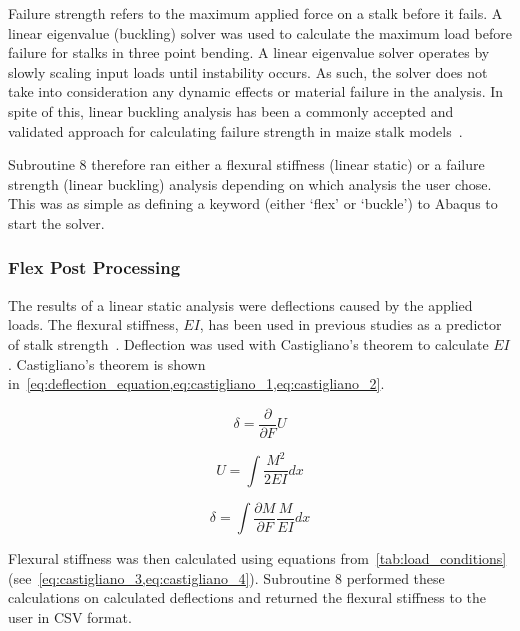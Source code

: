 Failure strength refers to the maximum applied force on a stalk before it fails. A linear eigenvalue (buckling) solver was used to calculate the maximum load before failure for stalks in three point bending. A linear eigenvalue solver operates by slowly scaling input loads until instability occurs. As such, the solver does not take into consideration any dynamic effects or material failure in the analysis. In spite of this, linear buckling analysis has been a commonly accepted and validated approach for calculating failure strength in maize stalk models~.

Subroutine 8 therefore ran either a flexural stiffness (linear static) or a failure strength (linear buckling) analysis depending on which analysis the user chose. This was as simple as defining a keyword (either ‘flex’ or ‘buckle’) to Abaqus to start the solver.

\subsubsection{Flex Post Processing}
\label{sssec:flex_post_processing}
The results of a linear static analysis were deflections caused by the applied loads. The flexural stiffness, {$EI$}, has been used in previous studies as a predictor of stalk strength~\cite{ottesen_development_2023-1,robertson_maize_2016}. Deflection was used with Castigliano’s theorem to calculate {$EI$}. Castigliano’s theorem is shown in~\cref{eq:deflection_equation,eq:castigliano_1,eq:castigliano_2}.

\begin{equation}
	\label{eq:deflection_equation}
	\delta = \frac{\partial}{\partial F} U
\end{equation}

\begin{equation}
	\label{eq:castigliano_1}
	U = \int \frac{M^{2}}{2EI} dx
\end{equation}

\begin{equation}
	\label{eq:castigliano_2}
	\delta = \int \frac{\partial M}{\partial F} \frac{M}{EI} dx
\end{equation}

Flexural stiffness was then calculated using equations from~\cref{tab:load_conditions} (see~\cref{eq:castigliano_3,eq:castigliano_4}). Subroutine 8 performed these calculations on calculated deflections and returned the flexural stiffness to the user in CSV format.

